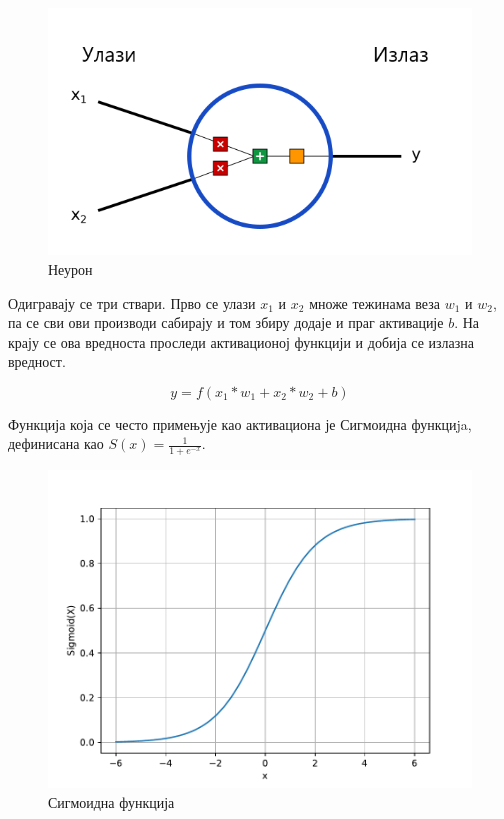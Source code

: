 \documentclass[12pt, а4paper]{article}
\begin{document}
\begin{figure}[H]
  \centering
      \includegraphics[scale=0.5]{slike/neuron}
  \caption{Неурон}
  \label{fig:neuron}
\end{figure}

Одигравају се три ствари. Прво се улази $x_1$ и $x_2$ множе тежинама
веза $w_1$ и $w_2$, па се сви ови производи сабирају
и том збиру додаје и праг активације $b$.
На крају се ова вредноста проследи активационој функцији и добија се излазна вредност.

\begin{equation}
 y = f(x_1 * w_1 + x_2 * w_2 + b)
\end{equation}

Функција која се често примењује као активациона је Сигмоидна функциja,
дефинисана као $S(x) = \frac{1}{1+e^{-x}}$.

\begin{figure}[H]
  \centering
      \includegraphics[scale=0.6]{slike/sigmoid}
  \caption{Сигмоидна функција}
  \label{fig:sigmoid}
\end{figure}
\end{document}
